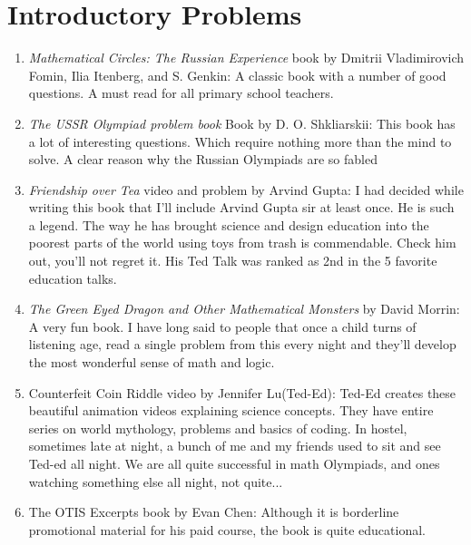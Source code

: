 \section{Introductory Problems}
\begin{enumerate}
    \item \emph{Mathematical Circles: The Russian Experience} book by Dmitrii Vladimirovich Fomin, Ilia Itenberg, and S. Genkin: A classic book with a number of good questions. A must read for all primary school teachers.
    \item \emph{The USSR Olympiad problem book} Book by D. O. Shkliarskii: This book has a lot of interesting questions. Which require nothing more than the mind to solve. A clear reason why the Russian Olympiads are so fabled
    \item \emph{Friendship over Tea} video and problem by Arvind Gupta: I had decided while writing this book that I'll include Arvind Gupta sir at least once. He is such a legend. The way he has brought science and design education into the poorest parts of the world using toys from trash is commendable. Check him out, you'll not regret it. His Ted Talk was ranked as 2nd in the 5 favorite education talks.
    \item \emph{The Green Eyed Dragon and Other Mathematical Monsters} by David Morrin: A very fun book. I have long said to people that once a child turns of listening age, read a single problem from this every night and they'll develop the most wonderful sense of math and logic.
    \item {Counterfeit Coin Riddle} video by Jennifer Lu(Ted-Ed): Ted-Ed creates these beautiful animation videos explaining science concepts. They have entire series on world mythology, problems and basics of coding. In hostel, sometimes late at night, a bunch of me and my friends used to sit and see Ted-ed all night. We are all quite successful in math Olympiads, and ones watching something else all night, not quite...
    \item {The OTIS Excerpts} book by Evan Chen: Although it is borderline promotional material for his paid course, the book is quite educational.
\end{enumerate}
